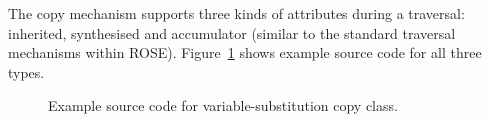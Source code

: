 The copy mechanism supports three kinds of attributes during a traversal: inherited, synthesised and accumulator (similar to the standard traversal mechanisms within ROSE).  Figure~\ref{Tutorial:attributeCopyExamples} shows example source code for all three types.

\begin{figure}[!h]
{\indent
{\mySmallFontSize

\begin{latexonly}
   
\end{latexonly}

\begin{htmlonly}
   
\end{htmlonly}

}
}
\caption{Example source code for variable-substitution copy class.}
\label{Tutorial:attributeCopyExamples}
\end{figure}
